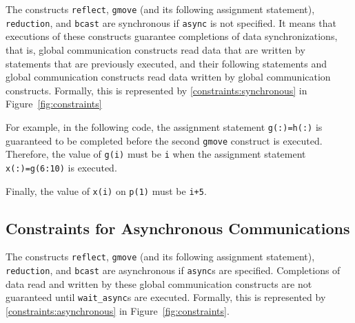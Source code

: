 The constructs \texttt{reflect}, \texttt{gmove} (and its following
assignment statement), \texttt{reduction}, and \texttt{bcast} are
synchronous if \texttt{async} is not specified.  It means that
executions of these constructs guarantee completions of data
synchronizations, that is, global communication constructs read data
that are written by statements that are previously executed, and their
following statements and global communication constructs read data
written by global communication constructs.  Formally, this is
represented by \ref{constraints:synchronous} in
Figure~\ref{fig:constraints}

For example, in the following code, the assignment statement
\texttt{g(:)=h(:)} is guaranteed to be completed before the second
\texttt{gmove} construct is executed.  Therefore, the value of
\texttt{g(i)} must be \texttt{i} when the assignment statement
\texttt{x(:)=g(6:10)} is executed.

Finally, the value of \texttt{x(i)} on \texttt{p(1)} must be
\texttt{i+5}.

\begin{center}
\end{center}

\subsection{Constraints for Asynchronous Communications}

The constructs \texttt{reflect}, \texttt{gmove} (and its following
assignment statement), \texttt{reduction}, and \texttt{bcast} are
asynchronous if \texttt{async}s are specified.  Completions of data
read and written by these global communication constructs are not
guaranteed until \texttt{wait\_async}s are executed.
Formally, this is represented by
\ref{constraints:asynchronous} in Figure~\ref{fig:constraints}.

